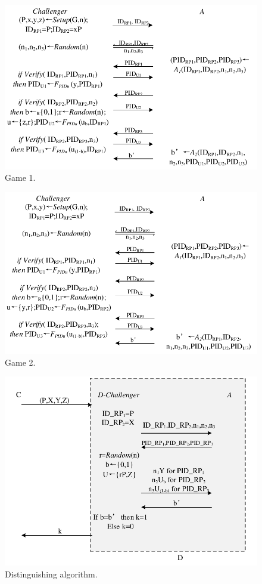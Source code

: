 \begin{figure}[t]
  \centering
  \includegraphics[width=1\linewidth]{fig/game1.pdf}
  \caption{Game 1.}
  \label{fig:game1}
\end{figure}




\begin{figure}[t]
  \centering
  \includegraphics[width=1\linewidth]{fig/game2.pdf}
  \caption{Game 2.}
  \label{fig:game2}
\end{figure}

\begin{figure}[t]
  \centering
  \includegraphics[width=1\linewidth]{fig/dalgorithm.pdf}
  \caption{Distinguishing algorithm.}
  \label{fig:dalgorithm}
\end{figure}